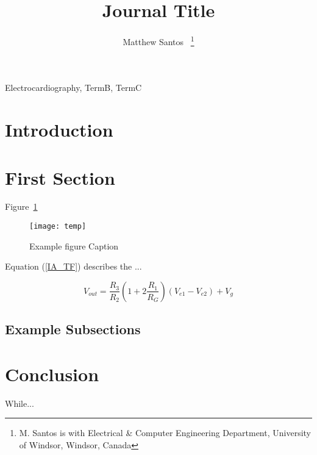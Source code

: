 \documentclass[journal]{templates/IEEEtran}
\begin{document}
\title{Journal Title}

\author{
	Matthew Santos~
	\thanks{M. Santos is with Electrical \& Computer Engineering Department, University of Windsor, Windsor, Canada}
}

\maketitle

\begin{abstract} %
	\lipsum[1]
\end{abstract}

\begin{IEEEkeywords} %
	Electrocardiography, TermB, TermC
\end{IEEEkeywords}

\section{Introduction} 

	\lipsum[2]

\section{First Section}

	\lipsum[3] Figure~\ref{myfig}

\begin{figure}[!b] %
	\centering
	\texttt{[image: temp]}
	\caption{Example figure Caption}
	\label{myfig}
\end{figure}

Equation (\ref{IA_TF}) describes the ...

\begin{equation}
V_{out} = \frac{R_3}{R_2}\left(1+2\frac{R_1}{R_G}\right)(V_{e1}-V_{e2})+V_g
\label{IA_TF}
\end{equation}

\newpage %

\subsection{Example Subsections}

\section{Conclusion} %

While...

\clearpage
{} %
\nocite{*} %


\end{document}
